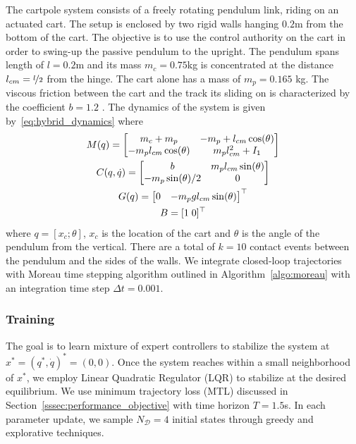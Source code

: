 The cartpole system consists of a freely rotating pendulum link, riding on an
actuated cart.
%
The setup is enclosed by two rigid walls hanging $0.2$m from the bottom of the
cart.
%
The objective is to use the control authority on the cart in order to swing-up
the passive pendulum to the upright.
%
The pendulum spans length of $l=0.2$m and its mass $m_c = 0.75$kg is
concentrated at the distance $l_{cm}=\nicefrac{l}{2}$ from the hinge.
%
The cart alone has a mass of $m_p=0.165$ kg. The viscous friction between the
cart and the track its sliding on is characterized by the coefficient $b=1.2$
.
%
The dynamics of the system
is given by~\eqref{eq:hybrid_dynamics} where 
\begin{equation}
    \begin{gathered}
        M(q) = \begin{bmatrix}m_c + m_p & -m_p+l_{cm} \cos(\theta) \\
        -m_pl_{cm}\cos(\theta) & m_p l_{cm}^2+I_1\end{bmatrix} \\
        C(q, \dot{q}) = \begin{bmatrix}b  & m_pl_{cm}\sin(\theta) \\
                -m_p\sin(\theta)/2 & 0\end{bmatrix} \\
        G(q) = \begin{bmatrix}0 & -m_pg l_{cm} \sin(\theta)\end{bmatrix}^\top \\
        B = [1 \; 0]^\top
    \end{gathered}
\end{equation}
\noindent where $q = [x_c; \theta]$, $x_c$ is the location of the cart and
$\theta$ is the angle of the pendulum from the vertical. 
%
There are a total of $k=10$ contact events between the pendulum and the sides of
the walls.
%
We integrate closed-loop trajectories with Moreau time stepping algorithm
outlined in Algorithm~\eqref{algo:moreau} with an integration time step $\Delta
t=0.001$.
%

\subsubsection{Training}
\label{sssec:cartpole_training}

The goal is to learn mixture of expert controllers to stabilize the system at
$x^* = (q^*, \dot{q})^* = (0, 0)$.
%
Once the system reaches within a small neighborhood of $x^*$, we employ Linear
Quadratic Regulator (LQR) to stabilize at the desired equilibrium.
%
We use minimum trajectory loss (MTL) discussed in
Section~\ref{sssec:performance_objective} with time horizon $T=1.5$s.
%
In each parameter update, we sample $N_{\mathcal{D}}=4$ initial states through
greedy and explorative techniques.
%


